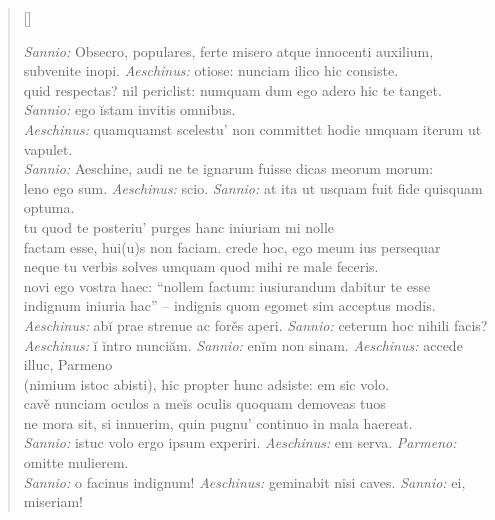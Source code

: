 


\settowidth{\versewidth}{aliquid. vah quemquamne hominem in animo instituere aut xxxx xxxx xxxx}
\begin{verse}[\versewidth]

\textit{Sannio:} Obsecro, populares, ferte misero atque innocenti auxilium,\\
subvenite inopi. \textit{Aeschinus:} otiose: nunciam ilico hic consiste.\\
quid respectas? nil periclist: numquam dum ego adero hic te tanget.\\
\textit{Sannio:} ego ĭstam invitis omnibus.\\
    \textit{Aeschinus:} quamquamst scelestu' non committet hodie umquam iterum ut vapulet.\\
\textit{Sannio:} Aeschine, audi ne te ignarum fuisse dicas meorum morum:\\
leno ego sum. \textit{Aeschinus:} scio. \textit{Sannio:} at ita ut usquam fuit fide quisquam optuma.\\
tu quod te posteriu' purges hanc iniuriam mi nolle\\
factam esse, hui(u)s non faciam. crede hoc, ego meum ius persequar\\
    neque tu verbis solves umquam quod mihi re male feceris.\\
    novi ego vostra haec: ``nollem factum: iusiurandum dabitur te esse\\
    indignum iniuria hac'' – indignis quom egomet sim acceptus modis.\\
\textit{Aeschinus:} abĭ prae strenue ac forěs aperi. \textit{Sannio:} ceterum hoc nihili facis?\\
\textit{Aeschinus:} ĭ ĭntro nunciăm. \textit{Sannio:} enĭm non sinam. \textit{Aeschinus:} accede illuc, Parmeno\\
    (nimium istoc abisti), hic propter hunc adsiste: em sic volo.\\
    cavě nunciam oculos a meĭs oculis quoquam demoveas tuos\\
    ne mora sit, si innuerim, quin pugnu' continuo in mala haereat.\\
    \textit{Sannio:} istuc volo ergo ipsum experiri. \textit{Aeschinus:} em serva. \textit{Parmeno:} omitte mulierem.\\
    \textit{Sannio:} o facinus indignum! \textit{Aeschinus:} geminabit nisi caves. \textit{Sannio:} ei, miseriam!\\

\end{verse}
